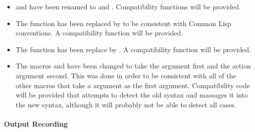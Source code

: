 \begin{itemize}
\item {} and 
have been renamed to  and
.  Compatibility functions will be
provided.

\item The function  has been replaced by
 to be consistent with Common Lisp
conventions.  A compatibility function will be provided.

\item The function  has been replace by
.  A compatibility function will be provided.

\item The macros  and 
have been changed to take the  argument first and the action
argument second.  This was done in order to be consistent with all of the other
macros that take a  argument as the first argument.  Compatibility
code will be provided that attempts to detect the old syntax and massages it
into the new syntax, although it will probably not be able to detect all cases.
\end{itemize}


\paragraph {Output Recording}


